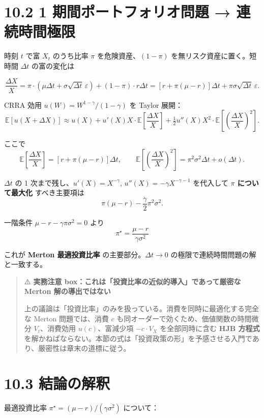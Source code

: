 \documentclass[11pt,a4paper]{report}
\begin{document}
\section{10.2 1 期間ポートフォリオ問題 → 連続時間極限}

時刻 $t$ で富 $X_t$ のうち比率 $\pi$ を危険資産、$(1-\pi)$ を無リスク資産に置く。短時間 $\Delta t$ の富の変化は

\[ \frac{\Delta X}{X} = \pi \cdot (\mu \Delta t + \sigma \sqrt{\Delta t}\, \varepsilon) + (1 - \pi) \cdot r \Delta t = [r + \pi(\mu - r)] \Delta t + \pi \sigma \sqrt{\Delta t}\, \varepsilon. \]

CRRA 効用 $u(W) = W^{1-\gamma}/(1-\gamma)$ を Taylor 展開： \[ \mathbb{E}[u(X + \Delta X)] \approx u(X) + u'(X) X \cdot \mathbb{E}\!\left[\frac{\Delta X}{X}\right] + \tfrac{1}{2} u''(X) X^2 \cdot \mathbb{E}\!\left[\left(\frac{\Delta X}{X}\right)^2\right]. \]

ここで \[ \mathbb{E}\!\left[\frac{\Delta X}{X}\right] = [r + \pi(\mu - r)] \Delta t, \qquad \mathbb{E}\!\left[\left(\frac{\Delta X}{X}\right)^2\right] = \pi^2 \sigma^2 \Delta t + o(\Delta t). \]

$\Delta t$ の 1 次まで残し、$u'(X) = X^{-\gamma}$, $u''(X) = -\gamma X^{-\gamma - 1}$ を代入して \textbf{$\pi$ について最大化} すべき主要項は \[ \pi (\mu - r) - \frac{\gamma}{2} \pi^2 \sigma^2. \]

一階条件 $\mu - r - \gamma \pi \sigma^2 = 0$ より \[ \boxed{\;\pi^\star = \frac{\mu - r}{\gamma \sigma^2}\;} \]

これが \textbf{Merton 最適投資比率} の主要部分。$\Delta t \to 0$ の極限で連続時間問題の解と一致する。

\begin{quote}
⚠️ \textbf{実務注意 box：これは「投資比率の近似的導入」であって厳密な Merton 解の導出ではない}

上の議論は「投資比率」のみを扱っている。消費を同時に最適化する完全な Merton 問題では、消費 $c$ も同オーダーで効くため、価値関数の時間微分 $V_t$、消費効用 $u(c)$、富減少項 $-c \cdot V_X$ を全部同時に含む \textbf{HJB 方程式} を解かねばならない。本節の式は「投資政策の形」を予感させる入門であり、厳密性は章末の道標に従う。
\end{quote}

\section{10.3 結論の解釈}

最適投資比率 $\pi^\star = (\mu - r)/(\gamma \sigma^2)$ について：
\end{document}
